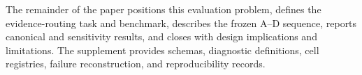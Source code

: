 The remainder of the paper positions this evaluation problem, defines the
evidence-routing task and benchmark, describes the frozen A--D sequence,
reports canonical and sensitivity results, and closes with design
implications and limitations.  The supplement provides schemas, diagnostic
definitions, cell registries, failure reconstruction, and reproducibility
records.

